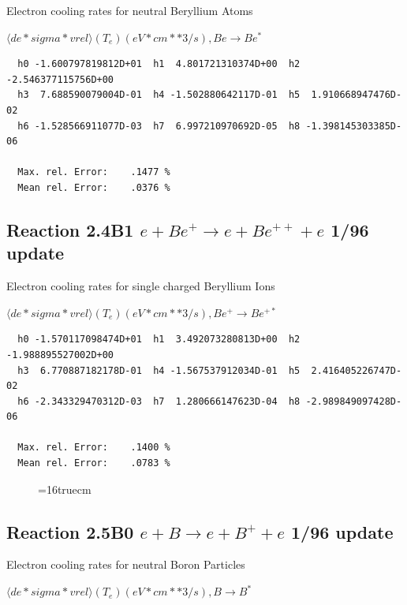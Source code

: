 \documentclass[12pt,dvips]{article}
\begin{document}
  Electron cooling rates for neutral
  Beryllium Atoms

 $ \langle de*sigma*vrel \rangle(T_e)  (eV*cm**3/s), Be  \rightarrow Be^*$

\begin{small}\begin{verbatim}
  h0 -1.600797819812D+01  h1  4.801721310374D+00  h2 -2.546377115756D+00
  h3  7.688590079004D-01  h4 -1.502880642117D-01  h5  1.910668947476D-02
  h6 -1.528566911077D-03  h7  6.997210970692D-05  h8 -1.398145303385D-06

  Max. rel. Error:    .1477 %
  Mean rel. Error:    .0376 %

\end{verbatim}\end{small}


\subsection{
Reaction 2.4B1 $e + Be^+ \rightarrow e + Be^{++} + e $ 1/96 update
}

  Electron cooling rates for single
  charged Beryllium Ions

 $ \langle de*sigma*vrel \rangle(T_e)  (eV*cm**3/s), Be^+ \rightarrow Be^{+*} $

\begin{small}\begin{verbatim}
  h0 -1.570117098474D+01  h1  3.492073280813D+00  h2 -1.988895527002D+00
  h3  6.770887182178D-01  h4 -1.567537912034D-01  h5  2.416405226747D-02
  h6 -2.343329470312D-03  h7  1.280666147623D-04  h8 -2.989849097428D-06

  Max. rel. Error:    .1400 %
  Mean rel. Error:    .0783 %

\end{verbatim}\end{small}

\begin{figure} \label{2.4Bl}
\epsfxsize=16truecm
\end{figure}
\newpage

\subsection{
Reaction 2.5B0 $e + B \rightarrow e + B^+ + e $ 1/96 update
}

 Electron cooling rates for neutral
 Boron Particles

$  \langle de*sigma*vrel \rangle(T_e)  (eV*cm**3/s), B   \rightarrow B^* $
\end{document}
